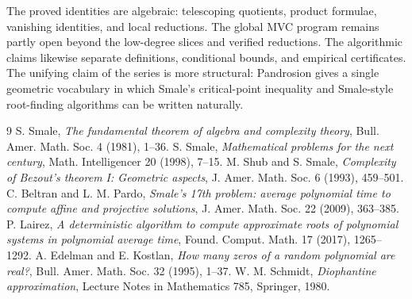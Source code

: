 \documentclass[11pt,a4paper]{article}
\theoremstyle{soft}
\theoremstyle{definition}
\begin{document}
The proved identities are algebraic: telescoping quotients, product formulae, vanishing identities, and local reductions.  The global MVC program remains partly open beyond the low-degree slices and verified reductions.  The algorithmic claims likewise separate definitions, conditional bounds, and empirical certificates.  The unifying claim of the series is more structural: Pandrosion gives a single geometric vocabulary in which Smale's critical-point inequality and Smale-style root-finding algorithms can be written naturally.

\begin{thebibliography}{9}
 S. Smale, \emph{The fundamental theorem of algebra and complexity theory}, Bull. Amer. Math. Soc. 4 (1981), 1--36.
 S. Smale, \emph{Mathematical problems for the next century}, Math. Intelligencer 20 (1998), 7--15.
 M. Shub and S. Smale, \emph{Complexity of Bezout's theorem I: Geometric aspects}, J. Amer. Math. Soc. 6 (1993), 459--501.
 C. Beltran and L. M. Pardo, \emph{Smale's 17th problem: average polynomial time to compute affine and projective solutions}, J. Amer. Math. Soc. 22 (2009), 363--385.
 P. Lairez, \emph{A deterministic algorithm to compute approximate roots of polynomial systems in polynomial average time}, Found. Comput. Math. 17 (2017), 1265--1292.
 A. Edelman and E. Kostlan, \emph{How many zeros of a random polynomial are real?}, Bull. Amer. Math. Soc. 32 (1995), 1--37.
 W. M. Schmidt, \emph{Diophantine approximation}, Lecture Notes in Mathematics 785, Springer, 1980.
\end{thebibliography}
\end{document}
